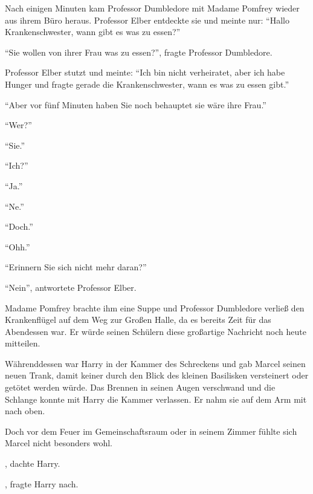 Nach einigen Minuten kam Professor Dumbledore mit Madame Pomfrey wieder aus ihrem Büro heraus. Professor Elber entdeckte sie und meinte nur: \enquote{Hallo Krankenschwester, wann gibt es was zu essen?}

\enquote{Sie wollen von ihrer Frau was zu essen?}, fragte Professor Dumbledore.

Professor Elber stutzt und meinte: \enquote{Ich bin nicht verheiratet, aber ich habe Hunger und fragte gerade die Krankenschwester, wann es was zu essen gibt.}

\enquote{Aber vor fünf Minuten haben Sie noch behauptet sie wäre ihre Frau.}

\enquote{Wer?}

\enquote{Sie.}

\enquote{Ich?}

\enquote{Ja.}

\enquote{Ne.}

\enquote{Doch.}

\enquote{Ohh.}

\enquote{Erinnern Sie sich nicht mehr daran?}

\enquote{Nein}, antwortete Professor Elber.

Madame Pomfrey brachte ihm eine Suppe und Professor Dumbledore verließ den Krankenflügel auf dem Weg zur Großen Halle, da es bereits Zeit für das Abendessen war. Er würde seinen Schülern diese großartige Nachricht noch heute mitteilen.

Währenddessen war Harry in der Kammer des Schreckens und gab Marcel seinen neuen Trank, damit keiner durch den Blick des kleinen Basilisken versteinert oder getötet werden würde. Das Brennen in seinen Augen verschwand und die Schlange konnte mit Harry die Kammer verlassen. Er nahm sie auf dem Arm mit nach oben.

Doch vor dem Feuer im Gemeinschaftsraum oder in seinem Zimmer fühlte sich Marcel nicht besonders wohl.


, dachte Harry.


, fragte Harry nach.



